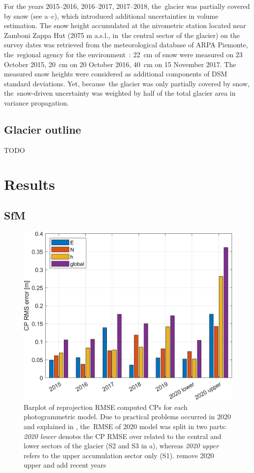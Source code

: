 For the years 2015--2016, 2016--2017, 2017--2018, the~glacier was partially covered by
snow (see a--c), which introduced additional uncertainties in
volume estimation.
The snow height accumulated at the nivometric station located near Zamboni Zappa Hut
(2075 m a.s.l., in~the central sector of the glacier) on the survey dates was retrieved
from the meteorological database of ARPA Piemonte, the~regional agency for the
environment~\citep{arpaPie}: \SI{22}{\centi\meter} of snow were measured on 23 October
2015, \SI{20}{\centi\meter} on 20 October 2016, \SI{40}{\centi\meter} on 15 November 2017.
The measured snow heights were considered as additional components of DSM standard
deviations.
Yet, because~the glacier was only partially covered by snow, the~snow-driven uncertainty
was weighted by half of the total glacier area in variance propagation.

\subsection{Glacier outline}\label{sec:3:method_outline}

{\color{red} TODO}

\section{Results}\label{sec:3:res}

\subsection{SfM}\label{sec:3:res:sfm}

\begin{figure}
    \centering
    \includegraphics[width=0.7\columnwidth]{CPrmse.png}
    \caption{Barplot of reprojection RMSE computed CPs for each photogrammetric
        model. Due to practical problems occurred in 2020 and explained in
        , the~RMSE of 2020 model was split in two parts:
        \textit{2020 lower} denotes the CP RMSE over related to the central and 
        lower sectors of the glacier (S2 and S3 in a), 
        whereas \textit{2020 upper} refers to the upper accumulation sector 
        only (S1). {\color{red} remove 2020 upper and add recent years}}
    \label{fig:3:CP_errors}
\end{figure}


